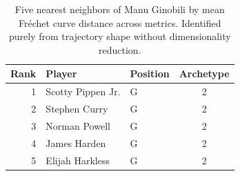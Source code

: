 \begin{table}[htbp]
  \centering\small
  \begin{tabular}{rllc}
    \toprule
    Rank & Player & Position & Archetype \\
    \midrule
    1 & Scotty Pippen Jr. & G & 2 \\
    2 & Stephen Curry & G & 2 \\
    3 & Norman Powell & G & 2 \\
    4 & James Harden & G & 2 \\
    5 & Elijah Harkless & G & 2 \\
    \bottomrule
  \end{tabular}
  \caption{Five nearest neighbors of Manu Ginobili by mean Fr\'{e}chet curve distance across metrics. Identified purely from trajectory shape without dimensionality reduction.}
  \label{tab:Manu_Ginobili_frechet_curve_neighbors}
\end{table}

